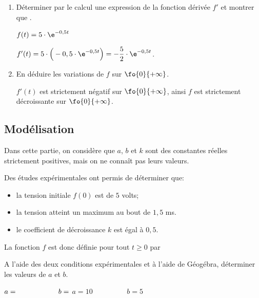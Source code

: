 \begin{enumerate}[series=monDS, resume]
    \item Déterminer par le calcul une expression de la fonction dérivée $f'$ et montrer que .
    \begin{blocvisiblex}[height=2.8]
    {\quad}
    $f(t)= 5 \cdot \e^{-0,5t}$

    $f'(t)= 5 \cdot \Big(-0,5\cdot \e^{-0,5t}\Big)=-\dfrac{5}{2}\cdot \e^{-0,5t}$.
    \end{blocvisiblex}
    \medskip
    \item En déduire les variations de $f$ sur $\fo{0}{+\infty}$.
    \begin{blocvisiblex}[height=3]
    {\quad}
    $f'(t)$ est strictement négatif sur $\fo{0}{+\infty}$, ainsi $f$ est strictement décroissante sur $\fo{0}{+\infty}$.
    \end{blocvisiblex}

\end{enumerate}


\subsection*{Modélisation}

Dans cette partie, on considère que $a$, $b$ et $k$ sont des constantes réelles strictement positives, mais on ne connaît pas leurs valeurs.

Des études expérimentales ont permis de déterminer que:
\begin{itemize}
    \item la tension initiale $f(0)$ est de $5$ volts;
    \item la tension atteint un maximum au bout de $1,5$ ms.
    \item le coefficient de décroissance $k$ est égal à $0,5$.
\end{itemize}

La fonction $f$ est donc définie pour tout $t\geqslant 0$ par 

\bigskip

\begin{enumerate}[series=monDS, resume]
    \begin{minipage}{0.48\textwidth}
    \item A l'aide des deux conditions expérimentales et à l'aide de Géogébra, déterminer les valeurs de $a$ et $b$.
\end{minipage}\hfill{}
\begin{minipage}{0.45\textwidth}
    \begin{blocvisiblex}[height=1.2]
    {$a=\dotfill \hspace{2cm} b=\dotfill$}
    $a=10 \hspace{2cm} b=5$
    \end{blocvisiblex}
\end{minipage}
    \appelprof{}
\end{enumerate}

